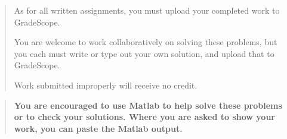\documentclass[12pt]{article}
\begin{document}

\begin{quote}
    As for all written assignments, you must upload your completed work to GradeScope.

    You are welcome to work collaboratively on solving these problems, but you each must write or type out your own solution, and upload that to GradeScope.

    Work submitted improperly will receive no credit.
\end{quote}

\begin{quote}\bf
You are encouraged to use Matlab to help solve these problems or to check your solutions.  Where you are asked to show your work, you can paste the Matlab output.
\end{quote}
\end{document}
